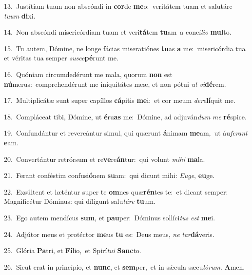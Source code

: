 {\numbfont\textcolor{\numbcolor}{13.}}~Justítiam tuam non abscóndi in \textbf{cor}\-de \textbf{me}\-o:~\star veritátem tuam et salutáre \textit{tu}\-\textit{um} \textbf{di}\-xi.\par
{\numbfont\textcolor{\numbcolor}{14.}}~Non abscóndi misericórdiam tuam et veri\-\textbf{tá}\-tem \textbf{tu}\-am~\star a concí\-\textit{li}\-\textit{o} \textbf{mul}\-to.\par
{\numbfont\textcolor{\numbcolor}{15.}}~Tu autem, Dómine, ne longe fácias miseratiónes \textbf{tu}\-as \textbf{a} me:~\star misericórdia tua et véritas tua semper \textit{su}\-\textit{sce}\textbf{pé}runt me.\par
{\numbfont\textcolor{\numbcolor}{16.}}~Quóniam circumdedérunt me mala, quorum \textbf{non} est \textbf{nú}\-merus:~\star comprehendérunt me iniquitátes meæ, et non pótui \textit{ut} \textit{vi}\-\textbf{dé}rem.\par
{\numbfont\textcolor{\numbcolor}{17.}}~Multiplicátæ sunt super capíllos \textbf{cá}\-pitis \textbf{me}\-i:~\star et cor meum \textit{de}\-\textit{re}\textbf{lí}quit me.\par
{\numbfont\textcolor{\numbcolor}{18.}}~Compláceat tibi, Dómine, ut \textbf{é}\-ru\textbf{as} me:~\star Dómine, ad adjuván\textit{dum} \textit{me} \textbf{ré}\-spice.\par
{\numbfont\textcolor{\numbcolor}{19.}}~Confundántur et revereántur simul, qui quærunt \textbf{á}\-nimam \textbf{me}\-am,~\star ut áu\-\textit{fe}\-\textit{rant} \textbf{e}\-am.\par
{\numbfont\textcolor{\numbcolor}{20.}}~Convertántur retrórsum et re\-\textbf{ve}\-re\-\textbf{án}\-tur:~\star qui volunt \textit{mi}\-\textit{hi} \textbf{ma}\-la.\par
{\numbfont\textcolor{\numbcolor}{21.}}~Ferant conféstim confusi\-\textbf{ó}\-nem \textbf{su}\-am:~\star qui dicunt mihi: \textit{Eu}\-\textit{ge}, \textbf{eu}\-ge.\par
{\numbfont\textcolor{\numbcolor}{22.}}~Exsúltent et læténtur super te \textbf{om}\-nes quæ\-\textbf{rén}\-tes te:~\star et dicant semper: Magnificétur Dóminus: qui díligunt salu\-\textit{tá}\-\textit{re} \textbf{tu}\-um.\par
{\numbfont\textcolor{\numbcolor}{23.}}~Ego autem mendícus \textbf{sum}\-, et \textbf{pau}\-per:~\star Dóminus sollíci\textit{tus} \textit{est} \textbf{me}\-i.\par
{\numbfont\textcolor{\numbcolor}{24.}}~Adjútor meus et protéctor \textbf{me}\-us \textbf{tu} es:~\star Deus meus, \textit{ne} \textit{tar}\-\textbf{dá}veris.\par
{\numbfont\textcolor{\numbcolor}{25.}}~Glória \textbf{Pa}\-tri, et \textbf{Fí}\-lio,~\star et Spirí\-\textit{tu}\-\textit{i} \textbf{Sanc}\-to.\par
{\numbfont\textcolor{\numbcolor}{26.}}~Sicut erat in princípio, et \textbf{nunc}\-, et \textbf{sem}\-per,~\star et in sǽcula sæcu\-\textit{ló}\-\textit{rum}. \textbf{A}\-men.\par
